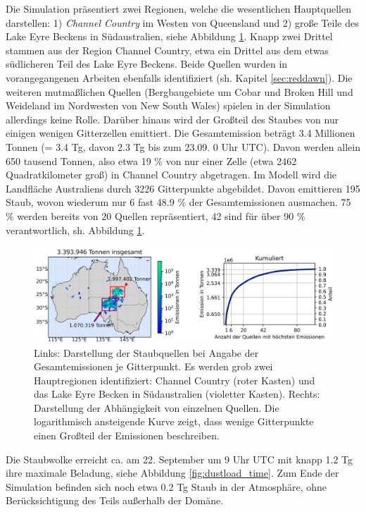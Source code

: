 \documentclass[12pt,a4paper,onecolumn]{scrartcl}
\begin{document}
Die Simulation präsentiert zwei Regionen, welche die wesentlichen Hauptquellen darstellen: 1) \textit{Channel Country} im Westen von Queensland und 2) große Teile des Lake Eyre Beckens in Südaustralien, siehe Abbildung \ref{fig:emissions}. Knapp zwei Drittel stammen aus der Region Channel Country, etwa ein Drittel aus dem etwas südlicheren Teil des Lake Eyre Beckens. Beide Quellen wurden in vorangegangenen Arbeiten ebenfalls identifiziert (sh. Kapitel \ref{sec:reddawn}). Die weiteren mutmaßlichen Quellen (Bergbaugebiete um Cobar und Broken Hill und Weideland im Nordwesten von New South Wales) spielen in der Simulation allerdings keine Rolle. Darüber hinaus wird der Großteil des Staubes von nur einigen wenigen Gitterzellen emittiert. Die Gesamtemission beträgt 3.4 Millionen Tonnen (= 3.4 Tg, davon 2.3 Tg bis zum 23.09. 0 Uhr UTC). Davon werden allein 650 tausend Tonnen, also etwa 19 \% von nur einer Zelle (etwa 2462 Quadratkilometer groß) in Channel Country abgetragen. Im Modell wird die Landfläche Australiens durch 3226 Gitterpunkte abgebildet. Davon emittieren 195 Staub, wovon wiederum nur 6 fast 48.9 \% der Gesamtemissionen ausmachen. 75 \% werden bereits von 20 Quellen repräsentiert, 42 sind für über 90 \% verantwortlich, sh. Abbildung \ref{fig:emissions}. 
\begin{figure}
\includegraphics[width=\textwidth]{bilder/emission_sections.png}
\caption{Links: Darstellung der Staubquellen bei Angabe der Gesamtemissionen je Gitterpunkt. Es werden grob zwei Hauptregionen identifiziert: Channel Country (roter Kasten) und das Lake Eyre Becken in Südaustralien (violetter Kasten). Rechts: Darstellung der Abhängigkeit von einzelnen Quellen. Die logarithmisch ansteigende Kurve zeigt, dass wenige Gitterpunkte einen Großteil der Emissionen beschreiben.} \label{fig:emissions}
\end{figure}
Die Staubwolke erreicht ca. am 22. September um 9 Uhr UTC mit knapp 1.2 Tg ihre maximale Beladung, siehe Abbildung \ref{fig:dustload_time}. Zum Ende der Simulation befinden sich noch etwa 0.2 Tg Staub in der Atmosphäre, ohne Berücksichtigung des Teils außerhalb der Domäne.
\end{document}
